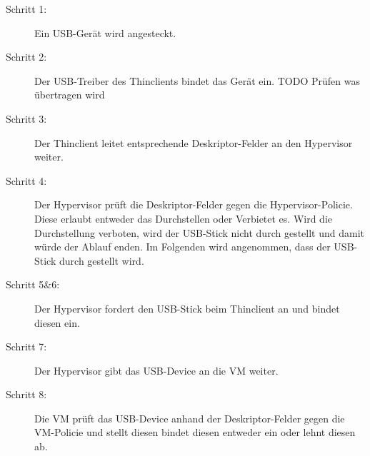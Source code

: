 \begin{description}
	\item[Schritt 1: ] Ein USB-Gerät wird angesteckt.
	\item[Schritt 2: ] Der USB-Treiber des Thinclients bindet das Gerät ein. TODO Prüfen was übertragen wird
	\item[Schritt 3: ] Der Thinclient leitet entsprechende Deskriptor-Felder an den Hypervisor weiter.
	\item[Schritt 4: ] Der Hypervisor prüft die Deskriptor-Felder gegen die Hypervisor-Policie. Diese erlaubt entweder das Durchstellen oder Verbietet es. Wird die Durchstellung verboten, wird der USB-Stick nicht durch gestellt und damit würde der Ablauf enden. Im Folgenden wird angenommen, dass der USB-Stick durch gestellt wird.
	\item[Schritt 5\&6: ] Der Hypervisor fordert den USB-Stick beim Thinclient an und bindet diesen ein.
	\item[Schritt 7: ] Der Hypervisor gibt das USB-Device an die VM weiter.
	\item[Schritt 8: ] Die VM prüft das USB-Device anhand der Deskriptor-Felder gegen die VM-Policie und stellt diesen bindet diesen entweder ein oder lehnt diesen ab.
\end{description}